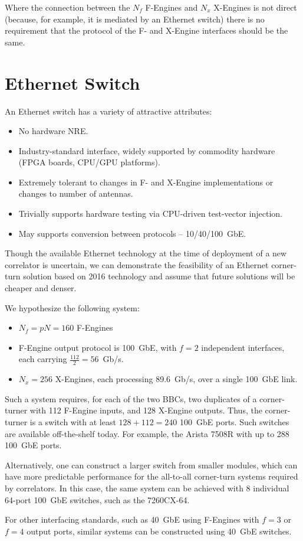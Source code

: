 \documentclass{article}
\begin{document}
Where the connection between the $N_f$ F-Engines and $N_x$ X-Engines is not direct (because, for example, it is mediated by an Ethernet switch) there is no requirement that the protocol of the F- and X-Engine interfaces should be the same.

\section{Ethernet Switch}
An Ethernet switch has a variety of attractive attributes:
\begin{itemize}
    \item No hardware NRE.
    \item Industry-standard interface, widely supported by commodity hardware (FPGA boards, CPU/GPU platforms).
    \item Extremely tolerant to changes in F- and X-Engine implementations or changes to number of antennas.
    \item Trivially supports hardware testing via CPU-driven test-vector injection.
    \item May supports conversion between protocols -- 10/40/100~GbE.
\end{itemize}

Though the available Ethernet technology at the time of deployment of a new correlator is uncertain, we can demonstrate the feasibility of an Ethernet corner-turn solution based on 2016 technology and assume that future solutions will be cheaper and denser.

We hypothesize the following system:
\begin{itemize}
    \item $N_f = pN = 160$ F-Engines
    \item F-Engine output protocol is 100~GbE, with $f=2$ independent interfaces, each carrying $\frac{112}{2} = 56$~Gb/s.
    \item $N_x = 256$ X-Engines, each processing 89.6~Gb/s, over a single 100~GbE link.
\end{itemize}

Such a system requires, for each of the two BBCs, two duplicates of a corner-turner with 112 F-Engine inputs, and 128 X-Engine outputs. Thus, the corner-turner is a switch with at least $128+112=240$ 100~GbE ports. Such switches are available off-the-shelf today. For example, the Arista 7508R with up to 288 100~GbE ports.

Alternatively, one can construct a larger switch from smaller modules, which can have more predictable performance for the all-to-all corner-turn systems required by correlators. In this case, the same system can be achieved with 8 individual 64-port 100~GbE switches, such as the 7260CX-64.

For other interfacing standards, such as 40~GbE using F-Engines with $f=3$ or $f=4$ output ports, similar systems can be constructed using 40~GbE switches.
\end{document}
